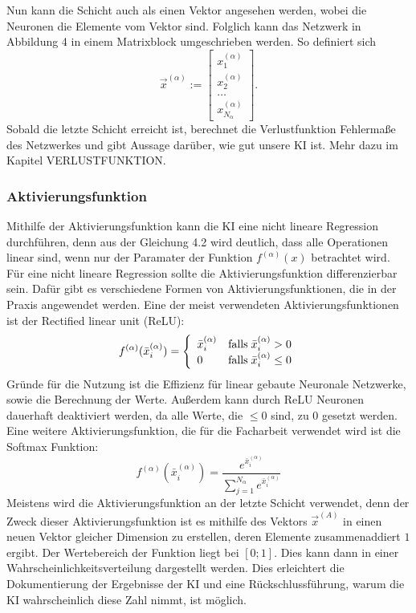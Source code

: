 \documentclass[11pt]{article}
\begin{document}
Nun kann die Schicht auch als einen Vektor angesehen werden, wobei die Neuronen die Elemente vom Vektor sind. Folglich kann das Netzwerk
in Abbildung 4 in einem Matrixblock umgeschrieben werden. So definiert sich
\begin{equation}
    \vec{x}^{(\alpha)} := \begin{bmatrix}x_{1}^{(\alpha)} \\ x_{2}^{(\alpha)} \\ \ldots \\ x_{N_{\alpha}}^{(\alpha)} \end{bmatrix}.
\end{equation}
Sobald die letzte Schicht erreicht ist, berechnet die Verlustfunktion Fehlermaße des Netzwerkes und gibt Aussage darüber, wie gut
unsere KI ist. Mehr dazu im Kapitel VERLUSTFUNKTION.


\subsubsection{Aktivierungsfunktion}
Mithilfe der Aktivierungsfunktion kann die KI eine nicht lineare Regression durchführen, denn aus der Gleichung 4.2 wird deutlich,
dass alle Operationen linear sind, wenn nur der Paramater der Funktion $f^{(\alpha)}(x)$ betrachtet wird. Für eine nicht lineare Regression sollte die
Aktivierungsfunktion differenzierbar sein. Dafür gibt es verschiedene Formen von Aktivierungsfunktionen, die in der Praxis angewendet werden.
Eine der meist verwendeten Aktivierungsfunktionen ist der Rectified linear unit (ReLU):
\begin{equation}
    f^{(\alpha)}(\bar{x}_{i}^{(\alpha)}) = \left\{
	\begin{array}{ll}
		\bar{x}_i^{(\alpha)}  & \mathrm{falls} \mkern5mu \bar{x}_i^{(\alpha)} > 0 \\
		0 & \mathrm{falls} \mkern5mu \bar{x}_i^{(\alpha)} \leq 0
	\end{array}
    \right.
\end{equation}
Gründe für die Nutzung ist die Effizienz für linear gebaute Neuronale Netzwerke, sowie die Berechnung der Werte. Außerdem kann durch ReLU
Neuronen dauerhaft deaktiviert werden, da alle Werte, die $\leq 0$ sind, zu $0$ gesetzt werden.
Eine weitere Aktivierungsfunktion, die für die Facharbeit verwendet wird ist die Softmax Funktion:
\begin{equation}
    f^{(\alpha)}(\bar{x}_{i}^{(\alpha)}) = \frac{e^{\bar{x}_i^{(\alpha)}}}{\sum_{j=1}^{N_{\alpha}} e^{\bar{x}_i^{(\alpha)}}}
\end{equation}
Meistens wird die Aktivierungsfunktion an der letzte Schicht verwendet, denn der Zweck dieser Aktivierungsfunktion ist es mithilfe des Vektors
$ \vec{x}^{(A)} $ in einen neuen Vektor gleicher Dimension zu erstellen, deren Elemente zusammenaddiert $1$ ergibt. Der Wertebereich der Funktion
liegt bei $[0;1]$. Dies kann dann in einer Wahrscheinlichkeitsverteilung dargestellt werden. Dies erleichtert die Dokumentierung der Ergebnisse der KI
und eine Rückschlussführung, warum die KI wahrscheinlich diese Zahl nimmt, ist möglich.
\end{document}
